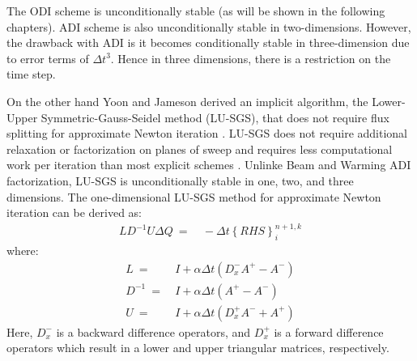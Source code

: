\documentclass[conf]{new-aiaa}
\begin{document}
The ODI scheme is unconditionally stable (as will be shown in the following chapters). ADI scheme is also unconditionally stable in two-dimensions.  However, the drawback with ADI is it becomes conditionally stable in three-dimension due to error terms of $\Delta{t}^3$. 
Hence in three dimensions, there is a restriction on the time step.

On the other hand Yoon and Jameson derived an implicit algorithm, the Lower-Upper Symmetric-Gauss-Seidel method (LU-SGS), that does not require flux splitting for approximate Newton iteration \cite{LUSGS}. 
LU-SGS does not require additional relaxation or factorization on planes of sweep and requires less computational work per iteration than most explicit schemes \cite{YoonLUSGS}. Unlinke Beam and Warming \cite{Beam} ADI factorization, LU-SGS is unconditionally stable in one, two, and three dimensions. The one-dimensional LU-SGS method for approximate Newton iteration can be derived as:
\begin{equation}
	\begin{split}
	\label{eq:LSGSUFinal}
		LD^{-1}U\Delta{Q}~=&~-\Delta{t}\left\{RHS\right\}^{n+1, k}_i
	\end{split}
\end{equation}
where:
\begin{equation}
	\begin{split}
            L~=&~I + \alpha\Delta{t}\left(D_x^-A^+-A^-\right)\\
		D^{-1}~=&~I + \alpha\Delta{t}\left(A^+-A^-\right) \\
		U~=&~I + \alpha\Delta{t}\left(D_x^+A^-+A^+\right)
	\end{split}
\end{equation}
Here, $D_x^-$ is a backward difference operators, and $D_x^+$ is a forward difference operators which result in a lower and upper triangular matrices, respectively.  
\end{document}
